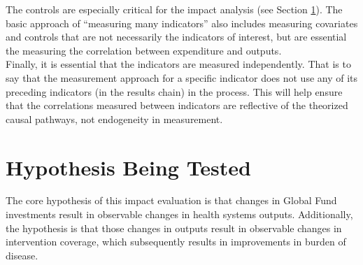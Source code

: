 \documentclass[twocolumn]{bmcart}%
\begin{document}
The controls are especially critical for the impact analysis (see Section \ref{hypothesis}). The basic approach of ``measuring many indicators'' also includes measuring covariates and controls that are not necessarily the indicators of interest, but are essential the measuring the correlation between expenditure and outputs. \\

Finally, it is essential that the indicators are measured independently. That is to say that the measurement approach for a specific indicator does not use any of its preceding indicators (in the results chain) in the process. This will help ensure that the correlations measured between indicators are reflective of the theorized causal pathways, not endogeneity in measurement.








\section{Hypothesis Being Tested} \label{hypothesis}

The core hypothesis of this impact evaluation is that changes in Global Fund investments result in observable changes in health systems outputs. Additionally, the hypothesis is that those changes in outputs result in observable changes in intervention coverage, which subsequently results in improvements in burden of disease. \\
\end{document}
